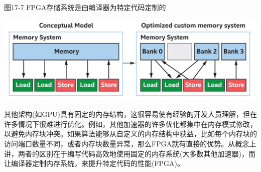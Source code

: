\hspace*{\fill} \par %
图17-7 FPGA存储系统是由编译器为特定代码定制的
\begin{center}
	\includegraphics[width=1.0\textwidth]{content/chapter-17/images/8}
\end{center}

其他架构(如GPU)具有固定的内存结构，这很容易使有经验的开发人员理解，但在许多情况下很难进行优化。例如，其他加速器的许多优化都集中在内存模式修改，以避免内存块冲突。如果算法能够从自定义的内存结构中获益，比如每个内存块的访问端口数量不同，或者内存块数量异常，那么FPGA就有直接的优势。从概念上讲，两者的区别在于编写代码高效地使用固定的内存系统(大多数其他加速器)，而让编译器定制内存系统，来提升特定代码的性能(FPGA)。\par



























